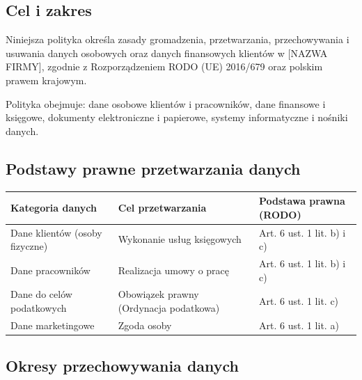 \documentclass[12pt,a4paper]{article}
\begin{document}
\subsection{Cel i zakres}\label{cel-i-zakres}

Niniejsza polityka określa zasady gromadzenia, przetwarzania,
przechowywania i usuwania danych osobowych oraz danych finansowych
klientów w {[}NAZWA FIRMY{]}, zgodnie z Rozporządzeniem RODO (UE)
2016/679 oraz polskim prawem krajowym.

Polityka obejmuje: dane osobowe klientów i pracowników, dane finansowe i
księgowe, dokumenty elektroniczne i papierowe, systemy informatyczne i
nośniki danych.

\subsection{Podstawy prawne przetwarzania
danych}\label{podstawy-prawne-przetwarzania-danych}

\begin{longtable}[]{@{}>{\raggedright\arraybackslash}p{}>{\raggedright\arraybackslash}p{}>{\raggedright\arraybackslash}p{}@{}}
\toprule\noalign{}
Kategoria danych & Cel przetwarzania & Podstawa prawna (RODO) \\
\midrule\noalign{}
\endhead
\bottomrule\noalign{}
\endlastfoot
Dane klientów (osoby fizyczne) & Wykonanie usług księgowych & Art. 6
ust. 1 lit. b) i c) \\
Dane pracowników & Realizacja umowy o pracę & Art. 6 ust. 1 lit. b) i
c) \\
Dane do celów podatkowych & Obowiązek prawny (Ordynacja podatkowa) &
Art. 6 ust. 1 lit. c) \\
Dane marketingowe & Zgoda osoby & Art. 6 ust. 1 lit. a) \\
\end{longtable}

\subsection{Okresy przechowywania
danych}\label{okresy-przechowywania-danych}
\end{document}

